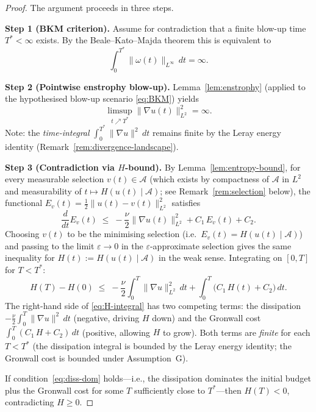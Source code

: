 \documentclass[12pt,a4paper]{article}
\theoremstyle{definition}
\theoremstyle{plain}
\theoremstyle{remark}
\begin{document}
\begin{proof}
The argument proceeds in three steps.

\medskip
\noindent\textbf{Step 1 (BKM criterion).}  Assume for contradiction that a finite
blow-up time $T^* < \infty$ exists.  By the Beale--Kato--Majda theorem
\cite{BealeKatoMajda1984} this is equivalent to
\begin{equation}\label{eq:BKM}
    \int_0^{T^*}\|\omega(t)\|_{L^\infty}\,dt = \infty.
\end{equation}

\medskip
\noindent\textbf{Step 2 (Pointwise enstrophy blow-up).}  Lemma~\ref{lem:enstrophy}
(applied to the hypothesised blow-up scenario \eqref{eq:BKM}) yields
\begin{equation}\label{eq:diss-inf}
    \limsup_{t \nearrow T^*}\|\nabla u(t)\|_{L^2}^2 = \infty.
\end{equation}
Note: the \emph{time-integral} $\int_0^{T^*}\|\nabla u\|^2\,dt$
remains finite by the Leray energy identity
(Remark~\ref{rem:divergence-landscape}).

\medskip
\noindent\textbf{Step 3 (Contradiction via $H$-bound).}
By Lemma~\ref{lem:entropy-bound}, for every measurable selection
$v(t)\in\mathcal{A}$ (which exists by compactness of $\mathcal{A}$ in $L^2$ and
measurability of $t\mapsto H(u(t)\mid\mathcal{A})$; see Remark~\ref{rem:selection}
below), the functional $E_v(t)=\tfrac12\|u(t)-v(t)\|_{L^2}^2$ satisfies
\[
    \frac{d}{dt}E_v(t)
    \;\le\; -\frac{\nu}{2}\|\nabla u(t)\|_{L^2}^2 + C_1\,E_v(t) + C_2.
\]
Choosing $v(t)$ to be the minimising selection (i.e.\ $E_v(t) = H(u(t)\mid\mathcal{A})$)
and passing to the limit $\varepsilon\to 0$ in the $\varepsilon$-approximate selection
gives the same inequality for $H(t):=H(u(t)\mid\mathcal{A})$ in the weak sense.
Integrating on $[0,T]$ for $T < T^*$:
\begin{equation}\label{eq:H-integral}
    H(T) - H(0)
    \;\le\;
    -\frac{\nu}{2}\int_0^T\|\nabla u\|_{L^2}^2\,dt
    + \int_0^T\!\big(C_1\,H(t) + C_2\big)\,dt.
\end{equation}
The right-hand side of \eqref{eq:H-integral} has two competing terms:
the dissipation $-\tfrac{\nu}{2}\int_0^T\|\nabla u\|^2\,dt$
(negative, driving $H$ down) and the Gronwall cost
$\int_0^T(C_1\,H + C_2)\,dt$ (positive, allowing $H$ to grow).
Both terms are \emph{finite} for each $T < T^*$ (the dissipation
integral is bounded by the Leray energy identity; the Gronwall cost
is bounded under Assumption~G).

If condition~\eqref{eq:diss-dom} holds---i.e., the dissipation
dominates the initial budget plus the Gronwall cost for some $T$
sufficiently close to $T^*$---then $H(T) < 0$, contradicting
$H \ge 0$.


\end{proof}
\end{document}
